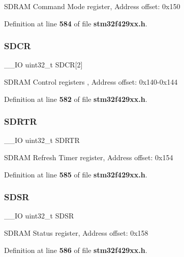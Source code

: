 S\+D\+R\+AM Command Mode register, Address offset\+: 0x150 

Definition at line \textbf{ 584} of file \textbf{ stm32f429xx.\+h}.

\mbox{\label{structFMC__Bank5__6__TypeDef_ab1e3bc93a98f5171261189864832681e}} 
\subsubsection{S\+D\+CR}
{\footnotesize\ttfamily \+\_\+\+\_\+\+IO uint32\+\_\+t S\+D\+CR[2]}

S\+D\+R\+AM Control registers , Address offset\+: 0x140-\/0x144 

Definition at line \textbf{ 582} of file \textbf{ stm32f429xx.\+h}.

\mbox{\label{structFMC__Bank5__6__TypeDef_aed6d294188e6135964d6c3431c741fda}} 
\subsubsection{S\+D\+R\+TR}
{\footnotesize\ttfamily \+\_\+\+\_\+\+IO uint32\+\_\+t S\+D\+R\+TR}

S\+D\+R\+AM Refresh Timer register, Address offset\+: 0x154 

Definition at line \textbf{ 585} of file \textbf{ stm32f429xx.\+h}.

\mbox{\label{structFMC__Bank5__6__TypeDef_ac36dc12c736f19eb2bc33fd6ab4c02de}} 
\subsubsection{S\+D\+SR}
{\footnotesize\ttfamily \+\_\+\+\_\+\+IO uint32\+\_\+t S\+D\+SR}

S\+D\+R\+AM Status register, Address offset\+: 0x158 

Definition at line \textbf{ 586} of file \textbf{ stm32f429xx.\+h}.

